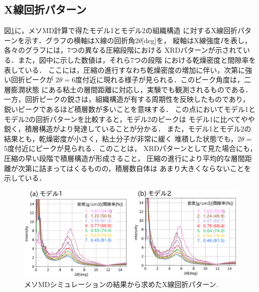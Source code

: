 \subsection{X線回折パターン}
図\ref{fig:fig6}に，メソMD計算で得たモデル1とモデル2の組織構造
に対するX線回折パターンを示す．グラフの横軸はX線の回折角$2\theta$[deg]を，
縦軸はX線強度$I$を表し，各々のグラフには，7つの異なる圧縮段階における
XRDパターンが示されている．また，図中に示した数値は，それら7つの段階
における乾燥密度と間隙率を表している．
ここには，圧縮の進行すなわち乾燥密度の増加に伴い，次第に強い回折ピークが
$2\theta=$6度付近に現れる様子が見られる．このピーク角度は，二層膨潤状態
にある粘土の層間距離に対応し，実験でも観測されるものである．
一方，回折ピークの鋭さは，組織構造が有する周期性を反映したものであり，
鋭いピークであるほど積層数が多いことを意味する．
この点においてモデル1とモデル2の回折パターンを比較すると，モデル2のピークは
モデル1に比べてやや鋭く，積層構造がより発達していることが分かる．
また，モデル1とモデル2の結果とも，乾燥密度が小さく，粘土分子が非常に緩く
堆積した状態でも，$2\theta=$5度付近にピークが見られる．このことは，
XRDパターンとして見た場合にも，圧縮の早い段階で積層構造が形成さること，
圧縮の進行により平均的な層間距離が次第に詰まってはくるものの，積層数自体は
あまり大きくならないことを示している．
\begin{figure}[h]
	\begin{center}
	\includegraphics[width=1.0\linewidth]{Figs/fig6.eps} 
	\end{center}
	\caption{
		メソMDシミュレーションの結果から求めたX線回折パターン.
	} 
	\label{fig:fig6}
\end{figure}
